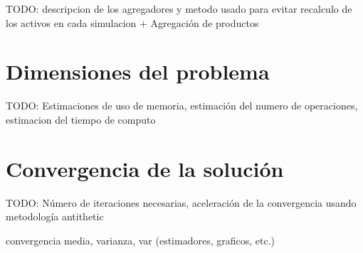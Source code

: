 TODO: descripcion de los agregadores y metodo usado para evitar recalculo 
de los activos en cada simulacion + Agregaci\'on de productos


\section{Dimensiones del problema}

TODO: Estimaciones de uso de memoria, estimaci\'on del numero de operaciones,
estimacion del tiempo de computo


\section{Convergencia de la soluci\'on}

TODO: N\'umero de iteraciones necesarias, aceleraci\'on de la convergencia
usando metodolog\'ia antithetic

convergencia media, varianza, var (estimadores, graficos, etc.)
